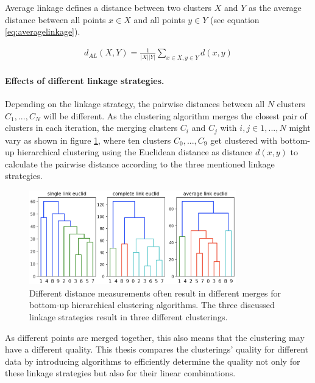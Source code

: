 Average linkage defines a distance between two clusters $X$ and $Y$ as the average distance between all points $x \in X$ and all points $y \in Y$ (see equation \ref{eq:averagelinkage}).

\begin{equation}
    \begin{aligned}
        d_{AL}(X,Y) = \frac{1}{|X||Y|}\sum\limits_{x \in X, y \in Y} d(x,y)
    \end{aligned}
    \label{eq:averagelinkage}
\end{equation}

\paragraph{Effects of different linkage strategies.}

Depending on the linkage strategy, the pairwise distances between all $N$ clusters $C_1, ..., C_N$ will be different. As the clustering algorithm merges the closest pair of clusters in each iteration, the merging clusters $C_i$ and $C_j$ with $i, j \in 1,...,N$ might vary as shown in figure \ref{fig:linkage_effects}, where ten clusters $C_0, ..., C_9$ get clustered with bottom-up hierarchical clustering using the Euclidean distance as distance $d(x,y)$ to calculate the pairwise distance according to the three mentioned linkage strategies.

\begin{figure}[h]
    \centering
    \includegraphics[width=0.8\textwidth]{images/linkage_effects}
    \caption{Different distance measurements often result in different merges for bottom-up hierarchical clustering algorithms. The three discussed linkage strategies result in three different clusterings.}
    \label{fig:linkage_effects}
\end{figure}

As different points are merged together, this also means that the clustering may have a different quality. This thesis compares the clusterings' quality for different data by introducing algorithms to efficiently determine the quality not only for these linkage strategies but also for their linear combinations.